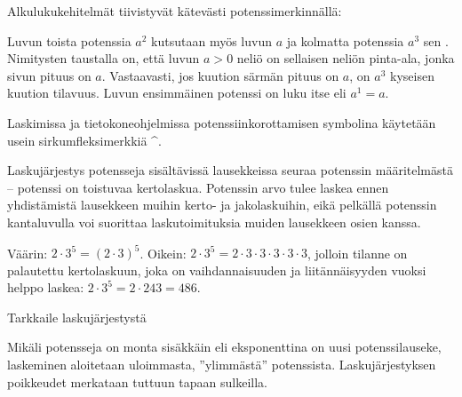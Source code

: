 \begin{esimerkki} %
Alkulukukehitelmät tiivistyvät kätevästi potenssimerkinnällä:
\end{esimerkki}

Luvun toista potenssia $a^2$ kutsutaan myös luvun $a$  ja kolmatta potenssia $a^3$ sen . Nimitysten taustalla on, että luvun $a>0$ neliö on sellaisen neliön pinta-ala, jonka sivun pituus on $a$. Vastaavasti, jos kuution särmän pituus on $a$, on $a^3$ kyseisen kuution tilavuus. Luvun ensimmäinen potenssi on luku itse eli $a^1 = a$. %

Laskimissa ja tietokoneohjelmissa potenssiinkorottamisen symbolina käytetään usein sirkumfleksimerkkiä \^{}. %

Laskujärjestys potensseja sisältävissä lausekkeissa seuraa potenssin määritelmästä -- potenssi on toistuvaa kertolaskua. Potenssin arvo tulee laskea ennen yhdistämistä lausekkeen muihin kerto- ja jakolaskuihin, eikä pelkällä potenssin kantaluvulla voi suorittaa laskutoimituksia muiden lausekkeen osien kanssa.

\begin{esimerkki}
Väärin: $2\cdot 3^5 = (2\cdot 3)^5$. Oikein: $2\cdot 3^5=2\cdot 3\cdot 3\cdot 3\cdot 3\cdot 3$, jolloin tilanne on palautettu kertolaskuun, joka on vaihdannaisuuden ja liitännäisyyden vuoksi helppo laskea: $2\cdot 3^5=2\cdot 243=486$.
\end{esimerkki}

\begin{esimerkki}
Tarkkaile laskujärjestystä
\end{esimerkki}  

Mikäli potensseja on monta sisäkkäin eli eksponenttina on uusi potenssilauseke, laskeminen aloitetaan uloimmasta, ''ylimmästä'' potenssista. Laskujärjestyksen poikkeudet merkataan tuttuun tapaan sulkeilla. %

\begin{esimerkki}
\end{esimerkki}

